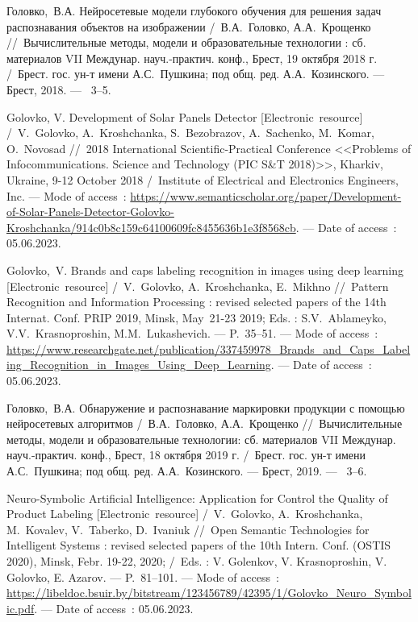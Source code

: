 Головко,~В.А. Нейросетевые модели глубокого обучения для решения задач распознавания объектов на изображении /~В.А.~Головко, А.А.~Крощенко
\newblock //~Вычислительные методы, модели и образовательные технологии : сб. материалов VII Междунар. науч.-практич. конф., Брест, 19 октября 2018 г.
\newblock /~Брест. гос. ун-т имени А.С.~Пушкина; под общ. ред. А.А.~Козинского. ---
\newblock Брест, 2018. ---
~3--5. 

Golovko, V. Development of Solar Panels Detector [Electronic~resource] /~V.~Golovko, A.~Kroshchanka, S.~Bezobrazov, A.~Sachenko, M.~Komar, O.~Novosad
\newblock //~2018 International Scientific-Practical Conference <<Problems of Infocommunications. Science and Technology (PIC S\&T 2018)>>, Kharkiv, Ukraine, 9-12 October 2018
\newblock /~Institute of Electrical and Electronics Engineers, Inc. ---
\newblock Mode of access~: \url{https://www.semanticscholar.org/paper/Development-of-Solar-Panels-Detector-Golovko-Kroshchanka/914c0b8c159c64100609fc8455636b1e3f8568cb}. ---
\newblock Date of access~: 05.06.2023.

Golovko,~V. Brands and caps labeling recognition in images using deep learning [Electronic~resource] /~V.~Golovko, A.~Kroshchanka, E.~Mikhno
\newblock //~Pattern Recognition and Information Processing : revised selected papers of the 14th Internat. Conf. PRIP 2019, Minsk, May~21-23 2019;
\newblock Eds. : S.V.~Ablameyko, V.V.~Krasnoproshin, M.M.~Lukashevich. ---
\newblock P.~35--51. ---
\newblock Mode of access~: \url{https://www.researchgate.net/publication/337459978_Brands_and_Caps_Labeling_Recognition_in_Images_Using_Deep_Learning}. ---
\newblock Date of access~: 05.06.2023.

Головко,~В.А. Обнаружение и распознавание маркировки продукции с помощью нейросетевых алгоритмов /~В.А.~Головко, А.А.~Крощенко
\newblock //~Вычислительные методы, модели и образовательные технологии: сб. материалов VII Междунар. науч.-практич. конф., Брест, 18 октября 2019 г.
\newblock /~Брест. гос. ун-т имени А.С.~Пушкина; под общ. ред. А.А.~Козинского. ---
\newblock Брест, 2019. ---
~3--6. 

Neuro-Symbolic Artificial Intelligence: Application for Control the Quality of Product Labeling [Electronic~resource] /~V.~Golovko, A.~Kroshchanka, M.~Kovalev, V.~Taberko, D.~Ivaniuk
\newblock //~Open Semantic Technologies for Intelligent Systems : revised selected papers of the 10th Intern. Conf. (OSTIS 2020), Minsk, Febr. 19-22, 2020;
\newblock /~Eds. : V. Golenkov, V. Krasnoproshin, V. Golovko, E. Azarov. ---
\newblock P.~81--101. ---
\newblock Mode of access~: \url{https://libeldoc.bsuir.by/bitstream/123456789/42395/1/Golovko_Neuro_Symbolic.pdf}. ---
\newblock Date of access~: 05.06.2023.

